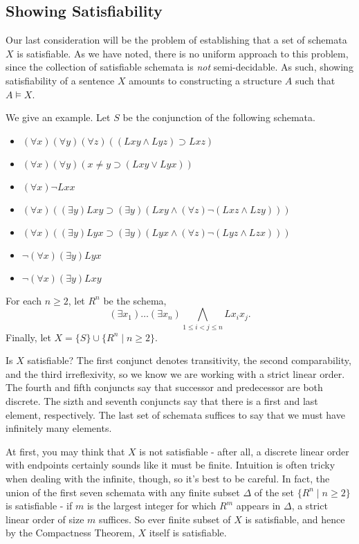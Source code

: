\subsection*{Showing Satisfiability}

Our last consideration will be the problem of establishing that a set of schemata $X$ is satisfiable. As we have noted, there is no uniform approach to this problem, since the collection of satisfiable schemata is \emph{not} semi-decidable. As such, showing satisfiability of a sentence $X$ amounts to constructing a structure $A$ such that $A \models X$. 

We give an example. Let $S$ be the conjunction of the following schemata.
\begin{itemize}
\item 
$(\forall x)(\forall y)(\forall z)((Lxy \wedge Lyz) \supset Lxz)$
\item
$(\forall x)(\forall y)(x\neq y\supset(Lxy \vee Lyx))$
\item
$(\forall x) \neg Lxx$
\item 
$(\forall x)((\exists y)Lxy\supset(\exists y)(Lxy\wedge (\forall z)\neg (Lxz\wedge Lzy)))$
\item 
$(\forall x)((\exists y)Lyx\supset(\exists y)(Lyx\wedge (\forall z)\neg (Lyz\wedge Lzx)))$
\item
$\neg(\forall x)(\exists y)Lyx$
\item
$\neg(\forall x)(\exists y)Lxy$
\end{itemize}
For each $n\geq 2$, let $R^n$ be the schema, 
\[
(\exists x_1)\ldots(\exists x_n)\bigwedge_{1\leq i< j\leq n}Lx_ix_j.
\]
Finally, let $X=\{S\}\cup\{R^n\mid n\geq 2\}$.

Is $X$ satisfiable? The first conjunct denotes transitivity, the second comparability, and the third irreflexivity, so we know we are working with a strict linear order. The fourth and fifth conjuncts say that successor and predecessor are both discrete. The sizth and seventh conjuncts say that there is a first and last element, respectively. The last set of schemata suffices to say that we must have infinitely many elements. 

At first, you may think that $X$ is not satisfiable - after all, a discrete linear order with endpoints certainly sounds like it must be finite. Intuition is often tricky when dealing with the infinite, though, so it's best to be careful. In fact, the union of the first seven schemata with any finite subset $\Delta$ of the set $\{R^n \mid n \geq 2\}$ is satisfiable - if $m$ is the largest integer for which $R^m$ appears in $\Delta$, a strict linear order of size $m$ suffices. So ever finite subset of $X$ is satisfiable, and hence by the Compactness Theorem, $X$ itself is satisfiable. 

